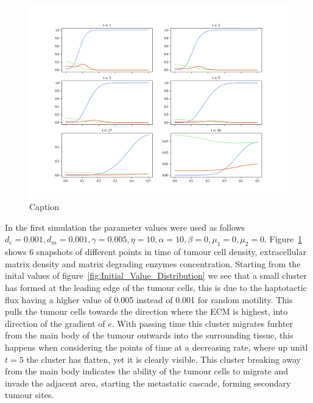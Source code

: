 \begin{figure}[h]
    \centering
    \includegraphics[width=\textwidth]{resources/images/0.001_0.001_0.001_10_0.1_0_0.005_0_0.png}
    \caption{Caption}
    \label{fig:0.001_0.001_0.001_10_0.1_0_0.005_0_0}
\end{figure}
In the first simulation the parameter values were used as follows $d_c = 0.001, d_m = 0.001, \gamma = 0.005, \eta = 10, \alpha = 10, \beta = 0, \mu_1 = 0, \mu_2 = 0$. Figure~\ref{fig:0.001_0.001_0.001_10_0.1_0_0.005_0_0} shows 6 snapshots of different points in time of tumour cell density, extracellular matrix density and matrix degrading enzymes concentration. Starting from the inital values of figure~\ref{fig:Initial_Value_Distribution} we see that a small cluster has formed at the leading edge of the tumour cells, this is due to the haptotactic flux having a higher value of 0.005 instead of 0.001 for random motility. This pulls the tumour cells towards the direction where the ECM is highest, into direction of the gradient of $e$. With passing time this cluster migrates furhter from the main body of the tumour outwards into the surrounding tissue, this happens when considering the points of time at a decreasing rate, where up unitl $t = 5$ the cluster has flatten, yet it is clearly visible. This cluster breaking away from the main body indicates the ability of the tumour cells to migrate and invade the adjacent area, starting the metastatic cascade, forming secondary tumour sites. 

